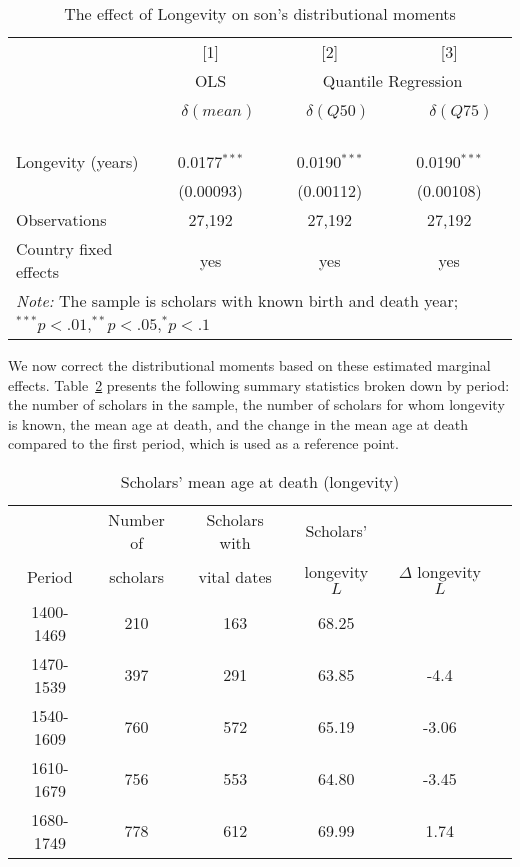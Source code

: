 \begin{table}[htbp]
\centering
\begin{tabular}{lccc}
\toprule
&[1] & [2] & [3]\\\vspace{0.1cm}
 & OLS		&  \multicolumn{2}{c}{Quantile Regression} \ \ \ \  \ \  \  \     \\\vspace{0.1cm}
 	& \ \ $\delta(mean)$ \ \ & \ \ $\delta(Q50)$ \ \ & \ \ \ $\delta(Q75)$ \ \ \ \\
\midrule
Longevity (years) 	 & 0.0177$^{***}$ & 0.0190$^{***}$ & 0.0190$^{***}$ \\
  & (0.00093) & (0.00112) & (0.00108) \\
Observations 	&  27,192  &  27,192 &  27,192  \\
Country fixed effects & yes & yes & yes\\
\bottomrule
\multicolumn{4}{l}{\footnotesize \textit{Note:} The sample is scholars with known birth and death year;$^{***}p{<}.01$,$^{**}p{<}.05$,$^{*}p{<}.1$}
\end{tabular}
\caption{The effect of Longevity on son's distributional moments}\label{tab:longevity0}
\end{table}

We now correct the distributional moments based on these estimated marginal effects. Table~\ref{tab:adjust1} presents the following summary statistics broken down by period: the number of scholars in the sample, the number of scholars for whom longevity is known, the mean age at death, and the change in the mean age at death compared to the first period, which is used as a reference point.

\clearpage
\begin{table}[ht]
\centering
\begin{tabular}{cccccc}
\toprule
                  & \multicolumn{1}{c}{Number of} & \multicolumn{1}{c}{Scholars with} & \multicolumn{1}{c}{Scholars' } & \\

            Period      & \multicolumn{1}{c}{scholars} & \multicolumn{1}{c}{vital dates} & \multicolumn{1}{c}{longevity $L$} & \multicolumn{1}{c}{$\Delta$ longevity $L$} \\
         \midrule
1400-1469     & 210      & 163      & 68.25    &  \\
1470-1539     & 397      & 291      & 63.85    & -4.4 \\
1540-1609     & 760      & 572      & 65.19    & -3.06 \\
1610-1679     & 756      & 553      & 64.80    & -3.45 \\
1680-1749     & 778      & 612      & 69.99    & 1.74 \\
\bottomrule
\end{tabular}
\caption{Scholars' mean age at death (longevity)}\label{tab:adjust1}
\end{table}

